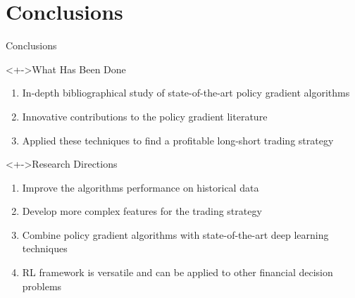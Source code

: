 \section{Conclusions}

\begin{frame}{Conclusions}
	\begin{block}<+->{What Has Been Done}
		\begin{enumerate}
			\item In-depth bibliographical study of state-of-the-art policy gradient algorithms
			\item Innovative contributions to the policy gradient literature
			\item Applied these techniques to find a profitable long-short trading strategy		
 		\end{enumerate}
	\end{block}
	
	\begin{block}<+->{Research Directions}
		\begin{enumerate}
			\item Improve the algorithms performance on historical data
			\item Develop more complex features for the trading strategy
			\item Combine policy gradient algorithms with state-of-the-art deep learning techniques
			\item RL framework is versatile and can be applied to other financial decision problems
		\end{enumerate}
	\end{block}
\end{frame}

